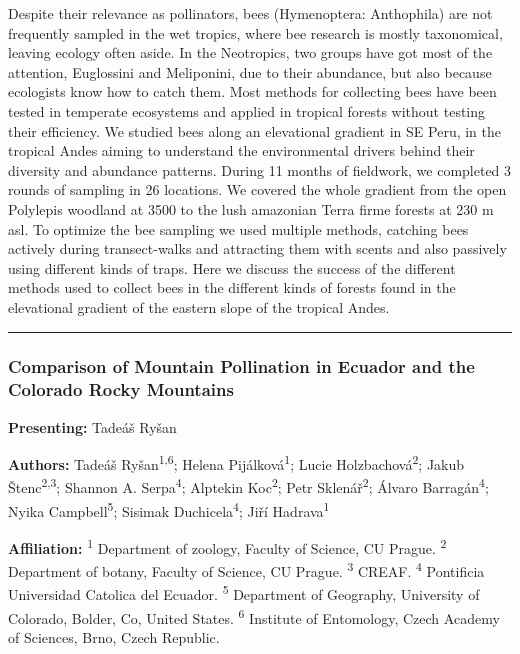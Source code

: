 \documentclass[
  letterpaper,
  DIV=11,
  numbers=noendperiod]{scrartcl}
\begin{document}
Despite their relevance as pollinators, bees (Hymenoptera: Anthophila)
are not frequently sampled in the wet tropics, where bee research is
mostly taxonomical, leaving ecology often aside. In the Neotropics, two
groups have got most of the attention, Euglossini and Meliponini, due to
their abundance, but also because ecologists know how to catch them.
Most methods for collecting bees have been tested in temperate
ecosystems and applied in tropical forests without testing their
efficiency. We studied bees along an elevational gradient in SE Peru, in
the tropical Andes aiming to understand the environmental drivers behind
their diversity and abundance patterns. During 11 months of fieldwork,
we completed 3 rounds of sampling in 26 locations. We covered the whole
gradient from the open Polylepis woodland at 3500 to the lush amazonian
Terra firme forests at 230 m asl. To optimize the bee sampling we used
multiple methods, catching bees actively during transect-walks and
attracting them with scents and also passively using different kinds of
traps. Here we discuss the success of the different methods used to
collect bees in the different kinds of forests found in the elevational
gradient of the eastern slope of the tropical Andes.

\begin{center}\rule{0.5\linewidth}{0.5pt}\end{center}

\subsubsection{Comparison of Mountain Pollination in Ecuador and the
Colorado Rocky
Mountains}\label{comparison-of-mountain-pollination-in-ecuador-and-the-colorado-rocky-mountains}

\textbf{Presenting:} Tadeáš Ryšan

\textbf{Authors:} Tadeáš Ryšan\textsuperscript{1,6}; Helena
Pijálková\textsuperscript{1}; Lucie Holzbachová\textsuperscript{2};
Jakub Štenc\textsuperscript{2,3}; Shannon A. Serpa\textsuperscript{4};
Alptekin Koc\textsuperscript{2}; Petr Sklenář\textsuperscript{2}; Álvaro
Barragán\textsuperscript{4}; Nyika Campbell\textsuperscript{5}; Sisimak
Duchicela\textsuperscript{4}; Jiří Hadrava\textsuperscript{1}

\textbf{Affiliation:} \textsuperscript{1} Department of zoology, Faculty
of Science, CU Prague. \textsuperscript{2} Department of botany, Faculty
of Science, CU Prague. \textsuperscript{3} CREAF. \textsuperscript{4}
Pontificia Universidad Catolica del Ecuador. \textsuperscript{5}
Department of Geography, University of Colorado, Bolder, Co, United
States. \textsuperscript{6} Institute of Entomology, Czech Academy of
Sciences, Brno, Czech Republic.
\end{document}
